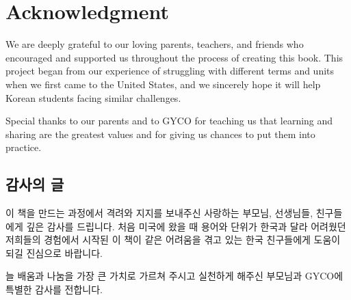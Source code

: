
  \section*{Acknowledgment}
  We are deeply grateful to our loving parents, teachers, and friends who encouraged 
  and supported us throughout the process of creating this book. This project began 
  from our experience of struggling with different terms and units when we first 
  came to the United States, and we sincerely hope it will help Korean students 
  facing similar challenges.
  
  Special thanks to our parents and to GYCO for teaching us that learning and 
  sharing are the greatest values and for giving us chances to put them into practice.
  
  \subsection*{감사의 글}
  이 책을 만드는 과정에서 격려와 지지를 보내주신 사랑하는 부모님, 선생님들, 친구들에게 깊은 
  감사를 드립니다. 처음 미국에 왔을 때 용어와 단위가 한국과 달라 어려웠던 저희들의 경험에서 
  시작된 이 책이 같은 어려움을 겪고 있는 한국 친구들에게 도움이 되길 진심으로 바랍니다.
  
  늘 배움과 나눔을 가장 큰 가치로 가르쳐 주시고 실천하게 해주신 부모님과 GYCO에 특별한 
  감사를 전합니다.
  